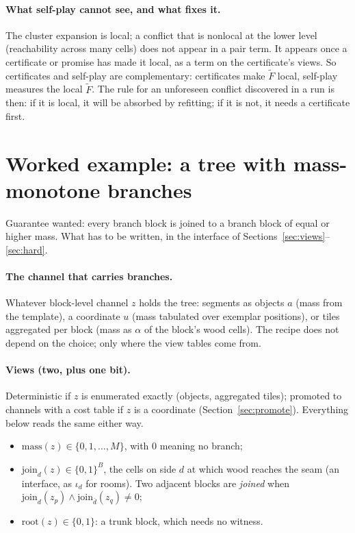 \documentclass[11pt]{article}
\newcommand{\1}{\mathds{1}}
\begin{document}
\paragraph{What self-play cannot see, and what fixes it.} The cluster
expansion is local; a conflict that is nonlocal at the lower level
(reachability across many cells) does not appear in a pair term. It appears
once a certificate or promise has made it local, as a term on the certificate's
views. So certificates and self-play are complementary: certificates make
$\tilde F$ local, self-play measures the local $\tilde F$. The rule for an
unforeseen conflict discovered in a run is then: if it is local, it will be
absorbed by refitting; if it is not, it needs a certificate first.

\section{Worked example: a tree with mass-monotone branches}
\label{sec:tree}

Guarantee wanted: every branch block is joined to a branch block of equal or
higher mass. What has to be written, in the interface of
Sections~\ref{sec:views}--\ref{sec:hard}.

\paragraph{The channel that carries branches.} Whatever block-level channel $z$
holds the tree: segments as objects $a$ (mass from the template), a coordinate
$u$ (mass tabulated over exemplar positions), or tiles aggregated per block
(mass as $\alpha$ of the block's wood cells). The recipe does not depend on
the choice; only where the view tables come from.

\paragraph{Views (two, plus one bit).} Deterministic if $z$ is enumerated
exactly (objects, aggregated tiles); promoted to channels with a cost table if
$z$ is a coordinate (Section~\ref{sec:promote}). Everything below reads the same
either way.
\begin{itemize}
  \item $\mathrm{mass}(z) \in \{0, 1, \dots, M\}$, with $0$ meaning no branch;
  \item $\mathrm{join}_d(z) \in \{0,1\}^{B}$, the cells on side $d$ at which wood
        reaches the seam (an interface, as $\iota_d$ for rooms). Two adjacent
        blocks are \emph{joined} when
        $\mathrm{join}_d(z_p) \wedge \mathrm{join}_{\bar d}(z_q) \ne 0$;
  \item $\mathrm{root}(z) \in \{0,1\}$: a trunk block, which needs no witness.
\end{itemize}
\end{document}
